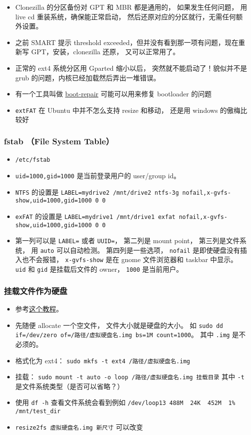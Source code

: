 \begin{itemize}
\item Clonezilla 的分区备份对 GPT 和 MBR 都是通用的， 如果发生任何问题， 用 live cd 重装系统，确保能正常启动， 然后还原对应的分区就行，无需任何额外设置。
\item 之前 SMART 提示 threshold exceeded，但并没有看到那一项有问题，现在重新写 GPT，安装，clonezilla 还原， 又可以正常用了。
\item  正常的 ext4 系统分区用 Gparted 缩小以后， 突然就不能启动了！貌似并不是 grub 的问题，内核已经加载然后弄出一堆错误。
\item 有一个工具叫做 \href{https://help.ubuntu.com/community/Boot-Repair}{boot-repair} 可能可以用来修复 bootloader 的问题
\item \verb|extFAT| 在 Ubuntu 中并不怎么支持 resize 和移动， 还是用 windows 的傲梅比较好
\end{itemize}

\subsubsection{fstab （File System Table）}
\begin{itemize}
\item \verb|/etc/fstab|
\item \verb|uid=1000,gid=1000| 是当前登录用户的 user/group id。
\item \verb|NTFS| 的设置是 \verb|LABEL=mydrive2 /mnt/drive2 ntfs-3g nofail,x-gvfs-show,uid=1000,gid=1000 0 0|
\item \verb|exFAT| 的设置是 \verb|LABEL=mydrive1 /mnt/drive1 exfat nofail,x-gvfs-show,uid=1000,gid=1000 0 0|
\item 第一列可以是 \verb|LABEL=| 或者 \verb|UUID=|， 第二列是 mount point， 第三列是文件系统， 用 \verb|auto| 可以自动检测。 第四列是一些选项， \verb|nofail| 是即使硬盘没有插入也不会报错， \verb|x-gvfs-show| 是在 gnome 文件浏览器和 taskbar 中显示。 \verb|uid| 和 \verb|gid| 是挂载后文件的 owner， \verb|1000| 是当前用户。
\end{itemize}

\subsubsection{挂载文件作为硬盘}
\begin{itemize}
\item 参考\href{https://www.tecmint.com/create-virtual-harddisk-volume-in-linux/}{这个教程}。
\item 先随便 allocate 一个空文件， 文件大小就是硬盘的大小。 如 \verb|sudo dd if=/dev/zero of=/路径/虚拟硬盘名.img bs=1M count=1000|。 其中 \verb|.img| 是不必须的。
\item 格式化为 ext4： \verb|sudo mkfs -t ext4 /路径/虚拟硬盘名.img|
\item 挂载： \verb|sudo mount -t auto -o loop /路径/虚拟硬盘名.img 挂载目录| 其中 \verb|-t| 是文件系统类型（是否可以省略？）
\item 使用 \verb|df -h| 查看文件系统会看到例如 \verb|/dev/loop13 488M  24K  452M  1% /mnt/test_dir|
\item \verb|resize2fs 虚拟硬盘名.img 新尺寸| 可以改变
\end{itemize}

